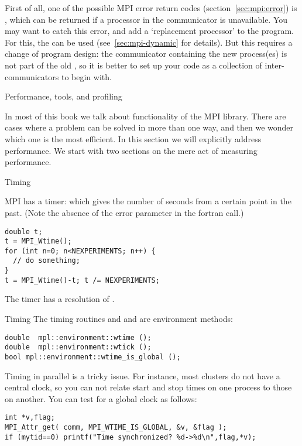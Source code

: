 First of all, one of the possible MPI error return codes
(section~\ref{sec:mpi:error}) is , which can be returned
if a processor in the communicator is unavailable. You may want to
catch this error, and add a `replacement processor' to the
program. For this, the  can be used
(see~\ref{sec:mpi-dynamic} for details).
%
But this requires a change of program design: the communicator
containing the new process(es) is not part of the
old , so it is better to set up your code as a
collection of inter-communicators to begin with.

 {Performance, tools, and profiling}
\label{sec:mpi-performance}

In most of this book we talk about functionality of the MPI
library. There are cases where a problem can be solved in more than
one way, and then we wonder which one is the most efficient. In this
section we will explicitly address performance. We start with two
sections on the mere act of measuring performance.

 {Timing}
\label{sec:mpi-timing}

MPI has a  timer: 
which gives the number of seconds from a certain point in the past.
(Note the absence of the error parameter in the fortran call.)
%
\begin{lstlisting}
double t;
t = MPI_Wtime();
for (int n=0; n<NEXPERIMENTS; n++) {
  // do something;
}
t = MPI_Wtime()-t; t /= NEXPERIMENTS;
\end{lstlisting}

The timer has a resolution of .

\begin{mplnote}{Timing}
  The timing routines  and 
  and 
  are environment methods:
\begin{lstlisting}
double 	mpl::environment::wtime ();
double 	mpl::environment::wtick ();
bool mpl::environment::wtime_is_global ();
\end{lstlisting}
\end{mplnote}

Timing in parallel is a tricky issue. For instance, most clusters do
not have a central clock, so you can not relate start and stop times
on one process to those on another. You can test for a global clock as
follows:
\begin{lstlisting}
int *v,flag;
MPI_Attr_get( comm, MPI_WTIME_IS_GLOBAL, &v, &flag );
if (mytid==0) printf("Time synchronized? %d->%d\n",flag,*v);
\end{lstlisting}

